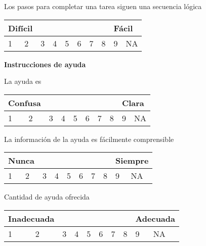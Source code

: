 \begin{tcolorbox}[colback=white!25!white,colframe=blue]
  Los pasos para completar una tarea siguen una secuencia lógica

  \begin{tabular}{| p{1cm} | p{1cm} | p{1cm} | p{1cm} | p{1cm} | p{1cm} | p{1cm} | p{1cm} | p{1cm} | p{1cm} |}
    \multicolumn{2}{p{1cm}}{Difícil} & \multicolumn{6}{p{1cm}}{} & \multicolumn{2}{p{1cm}}{Fácil} \\ \hline
    1 & 2 & 3 & 4 & 5 & 6 & 7 & 8 & 9 & NA \\ \hline
  \end{tabular}

  \hfill

  \textbf{Instrucciones de ayuda}

  La ayuda es

  \begin{tabular}{| p{1cm} | p{1cm} | p{1cm} | p{1cm} | p{1cm} | p{1cm} | p{1cm} | p{1cm} | p{1cm} | p{1cm} |}
    \multicolumn{2}{p{1cm}}{Confusa} & \multicolumn{6}{p{1cm}}{} & \multicolumn{2}{p{1cm}}{Clara} \\ \hline
    1 & 2 & 3 & 4 & 5 & 6 & 7 & 8 & 9 & NA \\ \hline
  \end{tabular}

  La información de la ayuda es fácilmente comprensible

  \begin{tabular}{| p{1cm} | p{1cm} | p{1cm} | p{1cm} | p{1cm} | p{1cm} | p{1cm} | p{1cm} | p{1cm} | p{1cm} |}
    \multicolumn{2}{p{1cm}}{Nunca} & \multicolumn{6}{p{1cm}}{} & \multicolumn{2}{p{1cm}}{Siempre} \\ \hline
    1 & 2 & 3 & 4 & 5 & 6 & 7 & 8 & 9 & NA \\ \hline
  \end{tabular}

  Cantidad de ayuda ofrecida

  \begin{tabular}{| p{1cm} | p{1cm} | p{1cm} | p{1cm} | p{1cm} | p{1cm} | p{1cm} | p{1cm} | p{1cm} | p{1cm} |}
    \multicolumn{2}{p{1cm}}{Inadecuada} & \multicolumn{6}{p{1cm}}{} & \multicolumn{2}{p{1cm}}{Adecuada} \\ \hline
    1 & 2 & 3 & 4 & 5 & 6 & 7 & 8 & 9 & NA \\ \hline
  \end{tabular}
\end{tcolorbox}

